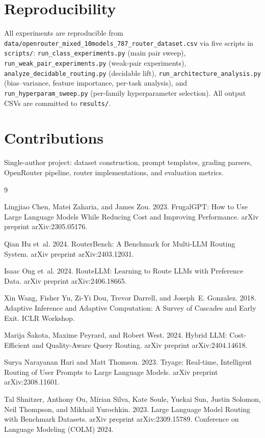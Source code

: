 \documentclass[11pt]{article}
\begin{document}
\section*{Reproducibility}
All experiments are reproducible from \texttt{data/openrouter\_mixed\_10models\_787\_router\_dataset.csv} via five scripts in \texttt{scripts/}: \texttt{run\_class\_experiments.py} (main pair sweep), \texttt{run\_weak\_pair\_experiments.py} (weak-pair experiments), \texttt{analyze\_decidable\_routing.py} (decidable lift), \texttt{run\_architecture\_analysis.py} (bias--variance, feature importance, per-task analysis), and \texttt{run\_hyperparam\_sweep.py} (per-family hyperparameter selection). All output CSVs are committed to \texttt{results/}.

\section*{Contributions}
Single-author project: dataset construction, prompt templates, grading parsers, OpenRouter pipeline, router implementations, and evaluation metrics.

\begin{thebibliography}{9}

Lingjiao Chen, Matei Zaharia, and James Zou. 2023.
\newblock FrugalGPT: How to Use Large Language Models While Reducing Cost and Improving Performance.
\newblock arXiv preprint arXiv:2305.05176.

Qian Hu et~al. 2024.
\newblock RouterBench: A Benchmark for Multi-LLM Routing System.
\newblock arXiv preprint arXiv:2403.12031.

Isaac Ong et~al. 2024.
\newblock RouteLLM: Learning to Route LLMs with Preference Data.
\newblock arXiv preprint arXiv:2406.18665.

Xin Wang, Fisher Yu, Zi-Yi Dou, Trevor Darrell, and Joseph~E. Gonzalez. 2018.
\newblock Adaptive Inference and Adaptive Computation: A Survey of Cascades and Early Exit.
\newblock ICLR Workshop.

Marija \v{S}akota, Maxime Peyrard, and Robert West. 2024.
\newblock Hybrid LLM: Cost-Efficient and Quality-Aware Query Routing.
\newblock arXiv preprint arXiv:2404.14618.

Surya Narayanan Hari and Matt Thomson. 2023.
\newblock Tryage: Real-time, Intelligent Routing of User Prompts to Large Language Models.
\newblock arXiv preprint arXiv:2308.11601.

Tal Shnitzer, Anthony Ou, M\'irian Silva, Kate Soule, Yuekai Sun, Justin Solomon, Neil Thompson, and Mikhail Yurochkin. 2023.
\newblock Large Language Model Routing with Benchmark Datasets.
\newblock arXiv preprint arXiv:2309.15789. Conference on Language Modeling (COLM) 2024.

\end{thebibliography}
\end{document}
